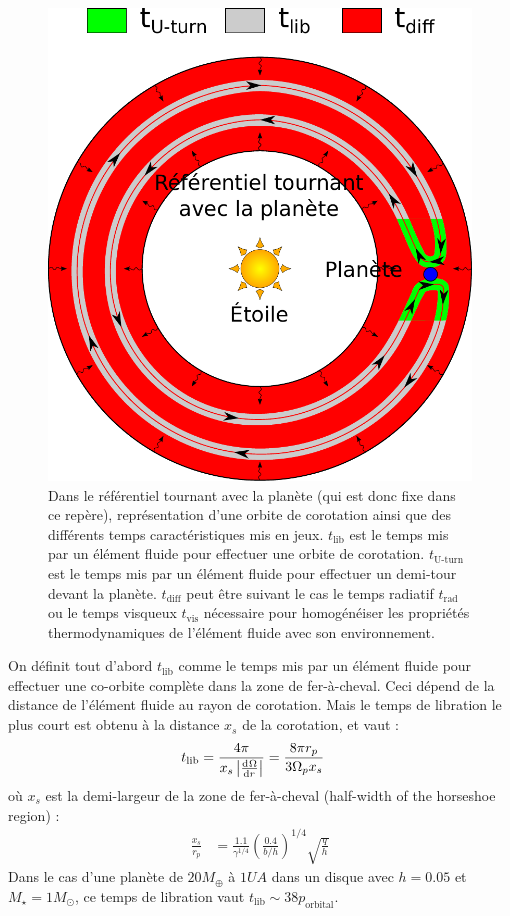 \begin{figure}[htbp]
\centering
\includegraphics[width=0.75\linewidth]{figure/corotation_times.pdf}
\caption[Temps caractéristiques mis en jeu dans la zone de corotation.]{Dans le référentiel tournant avec la planète (qui est
donc fixe dans ce repère), représentation d'une orbite de corotation ainsi que des différents temps caractéristiques mis en
jeux. $t_\text{lib}$ est le temps mis par un élément fluide pour effectuer une orbite de corotation. $t_\text{U-turn}$ est le
temps mis par un élément fluide pour effectuer un demi-tour devant la planète. $t_\text{diff}$ peut être suivant le cas le temps
radiatif $t_\text{rad}$ ou le temps visqueux $t_\text{vis}$ nécessaire pour homogénéiser les propriétés thermodynamiques de
l'élément fluide avec son environnement.}\label{fig:corotation_orbits}
\end{figure}

On définit tout d'abord $t_\text{lib}$ comme le temps mis par un élément fluide pour effectuer une co-orbite complète dans la zone de fer-à-cheval. Ceci dépend de la distance de l'élément fluide au rayon de corotation. Mais le temps de libration le plus court est obtenu à la distance $x_s$ de la corotation, et vaut \citep[eq. (52)]{baruteau2008corotation} : 
\begin{align}
t_\text{lib} &= \frac{4\pi}{x_s\abs{\od{\Omega}{r}}} = \frac{8\pi r_p}{3\Omega_p x_s}
\end{align}
où $x_s$ est la demi-largeur de la zone de fer-à-cheval (\og half-width of the horseshoe region\fg) \citep[eq. (44)]{paardekooper2010torque} :
\begin{align}
\frac{x_s}{r_p} &= \frac{1.1}{\gamma^{1/4}} \left(\frac{0.4}{b/h}\right)^{1/4} \sqrt{\frac{q}{h}}
\end{align}
Dans le cas d'une planète de $20\unit{M_\oplus}$ à $1\unit{UA}$ dans un disque avec $h=0.05$ et $M_\star=1M_\odot$, ce temps de libration vaut $t_\text{lib}\sim 38 p_\text{orbital}$. 

